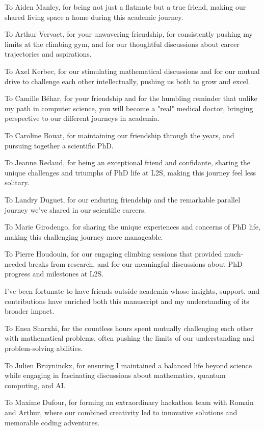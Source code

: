 To Aiden Manley, for being not just a flatmate but a true friend, making our shared living space a home during this academic journey.

To Arthur Vervaet, for your unwavering friendship, for consistently pushing my limits at the climbing gym, and for our thoughtful discussions about career trajectories and aspirations.

To Axel Kerbec, for our stimulating mathematical discussions and for our mutual drive to challenge each other intellectually, pushing us both to grow and excel.

To Camille Béhar, for your friendship and for the humbling reminder that unlike my path in computer science, you will become a "real" medical doctor, bringing perspective to our different journeys in academia.

To Caroline Bouat, for maintaining our friendship through the years, and pursuing together a scientific PhD.

To Jeanne Redaud, for being an exceptional friend and confidante, sharing the unique challenges and triumphs of PhD life at L2S, making this journey feel less solitary.

To Landry Duguet, for our enduring friendship and the remarkable parallel journey we've shared in our scientific careers.

To Marie Girodengo, for sharing the unique experiences and concerns of PhD life, making this challenging journey more manageable.

To Pierre Houdouin, for our engaging climbing sessions that provided much-needed breaks from research, and for our meaningful discussions about PhD progress and milestones at L2S.



I've been fortunate to have friends outside academia whose insights, support, and contributions have enriched both this manuscript and my understanding of its broader impact.

To Enea Sharxhi, for the countless hours spent mutually challenging each other with mathematical problems, often pushing the limits of our understanding and problem-solving abilities.

To Julien Bruyninckx, for ensuring I maintained a balanced life beyond science while engaging in fascinating discussions about mathematics, quantum computing, and AI.

To Maxime Dufour, for forming an extraordinary hackathon team with Romain and Arthur, where our combined creativity led to innovative solutions and memorable coding adventures.

